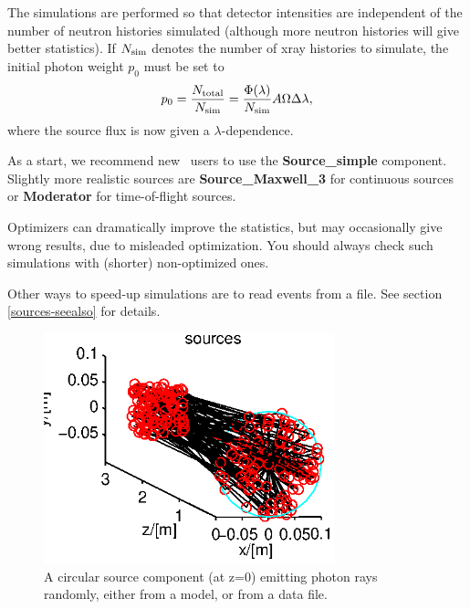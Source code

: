 The simulations are performed so that detector intensities
are independent of the number of neutron histories simulated
(although more neutron histories will give better statistics).
If $N_{\rm sim}$ denotes the number of
xray histories to simulate, the initial photon weight $p_0$ must be set to
\begin{equation}
\label{proprule}
p_0 = \frac{N_{\rm total}}{N_{\rm sim}} =
    \frac{\Phi(\lambda)}{N_{\rm sim}} A \Omega \Delta\lambda ,
\end{equation}
where the source flux is now given a $\lambda$-dependence.

As a start, we recommend new \MCX\ users to use the
{\bf Source\_simple} component.
Slightly more realistic sources are {\bf Source\_Maxwell\_3} for
continuous sources or {\bf Moderator} for time-of-flight sources.

Optimizers can dramatically improve the statistics, but may occasionally
give wrong results, due to misleaded optimization.
You should always check such simulations with (shorter) non-optimized ones.

Other ways to speed-up simulations are to read events from a file.
See section \ref{sources-seealso} for details.

\begin{figure}
  \begin{center}
    \includegraphics[width=0.75\textwidth]{figures/sources.eps}
  \end{center}
\caption{A circular source component (at z=0) emitting photon rays randomly, either from a model, or from a data file.}
\label{f:source}
\end{figure}

\newpage




